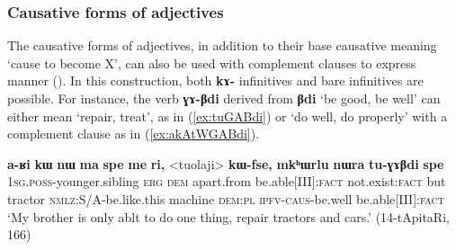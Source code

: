 \documentclass[oneside,a4paper,11pt]{article}
\newcommand{\ipa}[1]{\textbf{\phon#1}} %
\newcommand{\jpg}[2]{\ipa{#1} `#2'} %
\newcommand{\refb}[1]{(\ref{#1})}
\begin{document}
 
% 
%

\subsubsection{Causative forms of adjectives} \label{sec:adj.caus}
The causative forms of adjectives, in addition to their base causative meaning `cause to become X', can also be used with complement clauses to express manner (\citealt[184]{jacques15causative}). In this construction, both  \ipa{kɤ-} infinitives and bare infinitives are possible. For instance, the verb \ipa{ɣɤ-βdi} derived from \jpg{βdi}{be good, be well} can either mean `repair, treat', as in \refb{ex:tuGABdi} or `do well, do properly' with a complement clause as in \refb{ex:akAtWGABdi}.

\begin{exe}
\ex \label{ex:tuGABdi}
 \gll \ipa{a-ʁi} 	\ipa{kɯ} 	\ipa{nɯ} 	\ipa{ma} 	\ipa{spe} 	\ipa{me} 	\ipa{ri,} 	<tuolaji> 	\ipa{kɯ-fse,} 	\ipa{mkʰɯrlu} 	\ipa{nɯra} 	\ipa{tu-ɣɤβdi} 	\ipa{spe} \\
 \textsc{1sg.poss}-younger.sibling \textsc{erg} \textsc{dem} apart.from be.able[III]:\textsc{fact} not.exist:\textsc{fact} but tractor \textsc{nmlz}:S/A-be.like.this machine \textsc{dem:pl} \textsc{ipfv-caus}-be.well be.able[III]:\textsc{fact} \\
 \glt `My brother is only ablt to do one thing, repair tractors and cars.' (14-tApitaRi, 166)
\end{exe}
\end{document}
